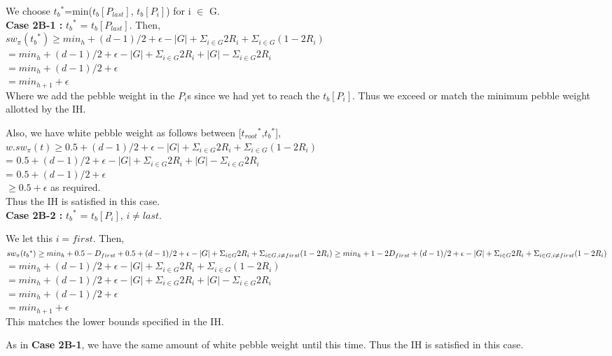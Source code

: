 \documentclass[12pt]{article}
\newcommand{\troots}{{t_{root}}^*}
\newcommand{\tbs}{{t_b}^{*}}
\newcommand{\tbith}{t_b[{P_i}]}
\newcommand{\tblast}{t_b[{P_{last}}]}
\begin{document}
\noindent
We choose $\tbs$=min($\tblast$, $\tbith$) for i $\in$ G.\\

\noindent
{\bf Case 2B-1 :} $\tbs$ = $\tblast$. Then,\\
$sw_\pi(\tbs) \geq min_h + (d-1)/2 + \epsilon - |G| + \Sigma_{ i \in G} 2R_i+ \Sigma_{i \in G} (1-2R_i)$\\
$= min_h + (d-1)/2 + \epsilon - |G| + \Sigma_{ i \in G} 2R_i + |G| - \Sigma_{i \in G} 2R_i$\\
$= min_h + (d-1)/2 + \epsilon$\\
$= min_{h+1} + \epsilon$\\
Where we add the pebble weight in the $P_i$s since we had yet to reach the $\tbith$. Thus we exceed or match the minimum pebble weight allotted by the IH.

Also, we have white pebble weight as follows between [$\troots$,$\tbs$],\\
$w.sw_\pi(t) \geq 0.5 + (d-1)/2 + \epsilon - |G| + \Sigma_{ i \in G} 2R_i+ \Sigma_{i \in G} (1 - 2{R_i})$\\
= $0.5 + (d-1)/2 + \epsilon - |G| + \Sigma_{ i \in G} 2R_i+ |G| - \Sigma_{i \in G} 2{R_i}$\\
= $0.5 + (d-1)/2 + \epsilon$\\
$\geq 0.5 + \epsilon$ as required.\\

Thus the IH is satisfied in this case.\\

\noindent
{\bf Case 2B-2 :} 
$\tbs$ = $\tbith$, $i \ne last$. 

We let this $i = first$. Then,\\
$sw_\pi(\tbs) \geq min_h+0.5-D_{first}+ 0.5 + (d-1)/2 + \epsilon - |G| + \Sigma_{ i \in G} 2R_i+  \Sigma_{i \in G, i \ne first} (1 - 2R_i)\\
\geq min_h+1-2D_{first}+ (d-1)/2 + \epsilon - |G| + \Sigma_{ i \in G} 2R_i +  \Sigma_{i \in G, i \ne first} (1 - 2R_i)$\\
$=min_h + (d-1)/2 + \epsilon - |G| + \Sigma_{ i \in G} 2R_i +  \Sigma_{i \in G} (1 - 2R_i)$\\
$= min_h + (d-1)/2 + \epsilon - |G| + \Sigma_{ i \in G} 2R_i + |G| - \Sigma_{i \in G} 2R_i$\\
$= min_h + (d-1)/2 + \epsilon$\\
$= min_{h+1} + \epsilon$\\
This matches the lower bounds specified in the IH.

As in {\bf Case 2B-1}, we have the same amount of white pebble weight until this time. Thus the IH is satisfied in this case.\\\\
\end{document}

